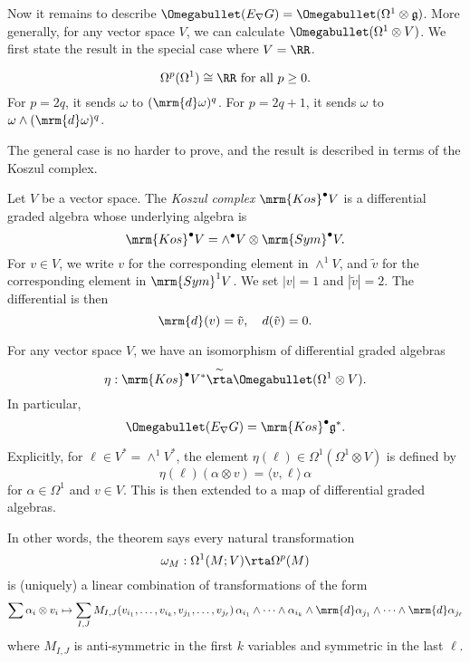 Now it remains to describe $\Omegabullet(E_\nabla G) = \Omegabullet(\Omega^1 \otimes \mathfrak{g})$. More generally, for any vector space $V$, we can calculate $\Omegabullet(\Omega^1 \otimes V)$. We first state the result in the special case where $V = \RR$.

\begin{thm}
  \[
    \Omega^p(\Omega^1) \cong \RR\text{ for all }p \geq 0.
  \]
  For $p = 2q$, it sends $\omega$ to $(\mrm{d}\omega)^q$. For $p = 2q + 1$, it sends $\omega$ to $\omega \wedge (\mrm{d} \omega)^q$.
\end{thm}

The general case is no harder to prove, and the result is described in terms of the Koszul complex.
\begin{defn}
  Let $V$ be a vector space. The \emph{Koszul complex} $\mrm{Kos}^\bullet V$ is a differential graded algebra whose underlying algebra is
  \[
    \mrm{Kos}^\bullet V = \wedge^\bullet V \otimes \mrm{Sym}^\bullet V.
  \]
  For $v \in V$, we write $v$ for the corresponding element in $\wedge^1 V$, and $\tilde{v}$ for the corresponding element in $\mrm{Sym}^1 V$. We set $|v| = 1$ and $|\tilde{v}| = 2$. The differential is then
  \[
    \mrm{d}(v) = \tilde{v},\quad d(\tilde{v}) = 0.
  \]
\end{defn}

\begin{thm}\label{thm:main}
  For any vector space $V$, we have an isomorphism of differential graded algebras
  \[
    \eta: \mrm{Kos}^\bullet V^* \overset{\sim}{\rta} \Omegabullet (\Omega^1 \otimes V).
  \]
  In particular,
  \[
    \Omegabullet (E_\nabla G) = \mrm{Kos}^\bullet \mathfrak{g}^*.
  \]

  Explicitly, for $\ell \in V^* = \wedge^1 V^*$, the element $\eta(\ell) \in \Omega^1(\Omega^1 \otimes V)$ is defined by
  \[
    \eta(\ell)(\alpha \otimes v) = \langle v, \ell\rangle\, \alpha
  \]
  for $\alpha \in \Omega^1$ and $v \in V$. This is then extended to a map of differential graded algebras.

  In other words, the theorem says every natural transformation
  \[
    \omega_M: \Omega^1(M; V) \rta \Omega^p(M)
  \]
  is (uniquely) a linear combination of transformations of the form
  \[
    \sum \alpha_i \otimes v_i \mapsto \sum_{I, J} M_{I, J}(v_{i_1}, \ldots, v_{i_k}, v_{j_1}, \ldots, v_{j_\ell})\, \alpha_{i_1} \wedge \cdots \wedge \alpha_{i_k} \wedge \mrm{d} \alpha_{j_1} \wedge \cdots \wedge \mrm{d} \alpha_{j_\ell}
  \]
  where $M_{I, J}$ is anti-symmetric in the first $k$ variables and symmetric in the last $\ell$.
\end{thm}

